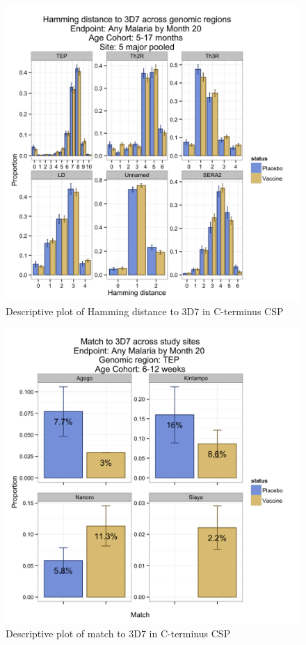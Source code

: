 \documentclass[]{article}
\begin{document}
\begin{figure}[htbp]
\centering
\includegraphics{figures/hamming-infant-x-1.png}
\caption{Descriptive plot of Hamming distance to 3D7 in C-terminus CSP}
\end{figure}

\begin{figure}[htbp]
\centering
\includegraphics{figures/match-newborn-sites-x-1.png}
\caption{Descriptive plot of match to 3D7 in C-terminus CSP}
\end{figure}
\end{document}
